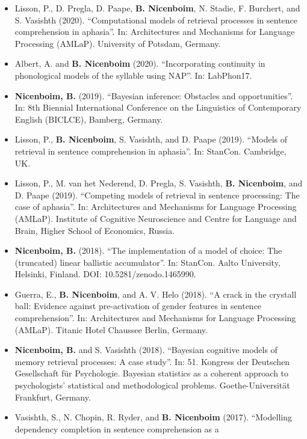 \documentclass[]{article}
\begin{document}
\begin{itemize}
\item
  Lisson, P., D. Pregla, D. Paape, \textbf{B. Nicenboim}, N. Stadie, F.
  Burchert, and S. Vasishth (2020). ``Computational models of retrieval
  processes in sentence comprehension in aphasia''. In: Architectures
  and Mechanisms for Language Processing (AMLaP). University of Potsdam,
  Germany.
\item
  Albert, A. and \textbf{B. Nicenboim} (2020). ``Incorporating
  continuity in phonological models of the syllable using NAP''. In:
  LabPhon17.
\item
  \textbf{Nicenboim, B.} (2019). ``Bayesian inference: Obstacles and
  opportunities''. In: 8th Biennial International Conference on the
  Linguistics of Contemporary English (BICLCE), Bamberg, Germany.
\item
  Lisson, P., \textbf{B. Nicenboim}, S. Vasishth, and D. Paape (2019).
  ``Models of retrieval in sentence comprehension in aphasia''. In:
  StanCon. Cambridge, UK.
\item
  Lisson, P., M. van het Nederend, D. Pregla, S. Vasishth, \textbf{B.
  Nicenboim}, and D. Paape (2019). ``Competing models of retrieval in
  sentence processing: The case of aphasia''. In: Architectures and
  Mechanisms for Language Processing (AMLaP). Institute of Cognitive
  Neuroscience and Centre for Language and Brain, Higher School of
  Economics, Russia.
\item
  \textbf{Nicenboim, B.} (2018). ``The implementation of a model of
  choice: The (truncated) linear ballistic accumulator''. In: StanCon.
  Aalto University, Helsinki, Finland. DOI: 10.5281/zenodo.1465990.
\item
  Guerra, E., \textbf{B. Nicenboim}, and A. V. Helo (2018). ``A crack in
  the crystall ball: Evidence against pre-activation of gender features
  in sentence comprehension''. In: Architectures and Mechanisms for
  Language Processing (AMLaP). Titanic Hotel Chaussee Berlin, Germany.
\item
  \textbf{Nicenboim, B.} and S. Vasishth (2018). ``Bayesian cognitive
  models of memory retrieval processes: A case study''. In: 51. Kongress
  der Deutschen Gesellschaft für Psychologie. Bayesian statistics as a
  coherent approach to psychologists' statistical and methodological
  problems. Goethe-Universität Frankfurt, Germany.
\item
  Vasishth, S., N. Chopin, R. Ryder, and \textbf{B. Nicenboim} (2017).
  ``Modelling dependency completion in sentence comprehension as a

\end{itemize}
\end{document}
